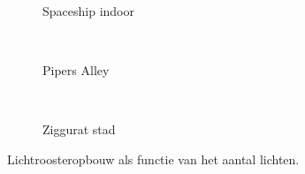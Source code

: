 \begin{figure}[t]
\begin{minipage}[t]{0.5\textwidth}
\begin{adjustbox}{minipage=\textwidth, scale=0.55}
\begin{subfigure}[b]{1.6\textwidth}
      \centering
      \def\svgwidth{\textwidth}
      
      \caption{Spaceship indoor}
      \vspace{4pt}
      \label{fig:ts-lc-resolution:indoor}
    \end{subfigure}
  \end{adjustbox} \\
  \begin{adjustbox}{minipage=\textwidth, scale=0.55}
    \begin{subfigure}[b]{1.6\textwidth}
      \centering
      \def\svgwidth{\textwidth}
      
      \caption{Pipers Alley}
      \vspace{4pt}
      \label{fig:ts-lights-grid:alley}
    \end{subfigure}
  \end{adjustbox} \\
  \begin{adjustbox}{minipage=\textwidth, scale=0.55}
    \begin{subfigure}[b]{1.6\textwidth}
      \centering
      \def\svgwidth{\textwidth}
      
      \caption{Ziggurat stad}
      \label{fig:ts-lights-grid:city}
    \end{subfigure}
  \end{adjustbox}
  \caption{\small Lichtroosteropbouw als functie van het aantal lichten. }
  \label{fig:ts-lights-grid}
  \end{minipage}
\end{figure}

